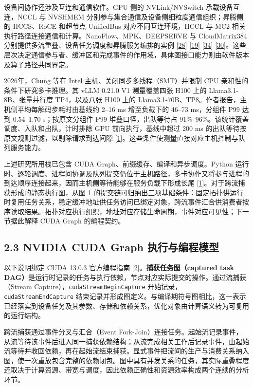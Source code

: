 \documentclass[UTF8,10.5pt,fontset=windows]{ctexart}
\begin{document}
设备间协作还涉及互连和通信软件。GPU 侧的 NVLink/NVSwitch
承载设备互连，NCCL 与 NVSHMEM
分别参与集合通信及设备侧细粒度通信组织；昇腾侧的 HCCS、RoCE 和超节点
UnifiedBus 对应不同互连环境，HCCL 与 MC2
相关执行路径连接通信和计算。NanoFlow、MPK、DEEPSERVE 与 CloudMatrix384
分别提供多流重叠、设备任务调度和昇腾服务编排的实例
{[}\protect\hyperlink{ref-zhu2025nanoflow}{28}{]}
{[}\protect\hyperlink{ref-cheng2026mpk}{19}{]}
{[}\protect\hyperlink{ref-hu2025deepserve}{34}{]}
{[}\protect\hyperlink{ref-zuo2025cloudmatrix384}{30}{]}。这些层次决定通信参与者、缓冲区和完成事件的作用域，具体图接口能力则由软件版本及算子路径共同界定。

2026年，Chung 等在 Intel 主机、关闭同步多线程（SMT）并限制 CPU
亲和性的条件下研究多卡推理。其 vLLM 0.21.0 V1 测量覆盖四张 H100 上的
Llama3.1-8B、张量并行度 TP4，以及八张 H100 上的
Llama3.1-70B、TP8。作者报告，主机侧平均每解码步耗时由基线约 2--16 ms
增至负载下的 46--73 ms，分组件 P99 达到 0.54--1.70 s；按原文分组件 P99
堆叠口径，出队等待占 91\%--96\%。该统计覆盖调度、入队和出队，计时排除
GPU 前向执行，基线中超过 200 ms
的出队等待按原文规则过滤，以剔除请求到达间隙
{[}\protect\hyperlink{ref-chung2026cpu}{1}{]}。这些条件使测量直接对应主机控制与队列服务能力。

上述研究所用栈已包含 CUDA Graph、前缀缓存、编译和异步调度。Python
运行时、逐轮调度、进程间协调及队列提交仍位于主机路径，多卡协作又将参与进程的到达顺序连接起来，因而主机侧等待能够在服务负载下形成长尾
{[}\protect\hyperlink{ref-chung2026cpu}{1}{]}。对于跨流捕获形成的静态执行图，从图
1
的提交链可归纳出三项基础条件：固定拓扑供运行时复用任务关系，稳定缓冲地址供任务访问已绑定对象，跨流事件汇合供消费者按序读取结果。拓扑对应执行组织，地址对应存储生命周期，事件对应可见性；下一节据此解释
CUDA Graph 的编程契约。

\hypertarget{section-2-3}{%
\subsection{2.3 NVIDIA CUDA Graph 执行与编程模型}\label{section-2-3}}

以下说明绑定 CUDA 13.0.3 官方编程指南
{[}\protect\hyperlink{ref-nvidia2026cuda1303}{2}{]}。\textbf{捕获任务图（captured
task
DAG）}是运行时记录的任务与执行依赖，节点对应实际提交的操作。通过流捕获（Stream
Capture），\nolinkurl{cudaStreamBeginCapture}
开始记录，\nolinkurl{cudaStreamEndCapture}
结束记录并形成图定义。与编译期符号图相比，这一表示已经落实到设备任务及其参数、存储和依赖关系，优化对象由计算语义转为可复用的运行结构。

跨流捕获通过事件分叉与汇合（Event
Fork-Join）连接任务。起始流记录事件，从流等待该事件后进入同一捕获依赖结构；从流完成相关工作后记录事件，由起始流等待并收回依赖，再在起始流结束捕获。显式事件把流间的生产与消费关系纳入图，使一次重放包含完整的依赖闭包。图中具有并发关系的任务，其实际重叠程度还取决于计算资源、带宽与调度，因此依赖正确性和资源效率构成两个连续的分析环节。
\end{document}
